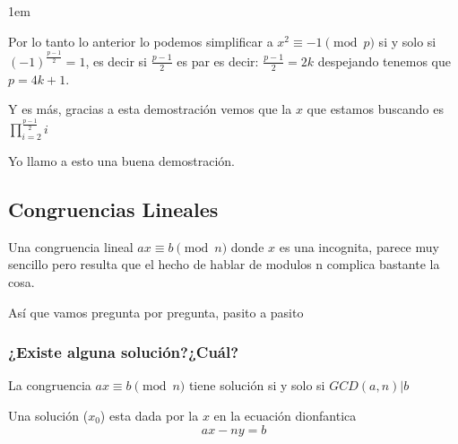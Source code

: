 \documentclass[12pt, fleqn]{report}                             %
\newenvironment{SmallIndentation}[1][0.75em]                    %
    {\begin{adjustwidth}{#1}{}\begin{footnotesize}}                 %
    {\end{footnotesize}\end{adjustwidth}}                           %
\begin{document}
\begin{itemize}
\begin{SmallIndentation}[1em]
                    Por lo tanto lo anterior lo podemos simplificar a 
                    $x^2 \equiv -1 \pmod{p}$ si y solo si 
                    $(-1)^{\frac{p-1}{2}} = 1$, es decir si $\frac{p-1}{2}$ es par
                    es decir: $\frac{p-1}{2} = 2k$ despejando tenemos que 
                    $p=4k+1$.


                    Y es más, gracias a esta demostración vemos que la $x$ que estamos
                    buscando es $\prod_{i=2}^{\frac{p-1}{2}} i$
                    
                    Yo llamo a esto una buena demostración.

                \end{SmallIndentation}
            \end{itemize}



        \subsection{Congruencias Lineales}


            Una congruencia lineal $ax \equiv b \pmod{n}$ donde $x$ es una incognita,
            parece muy sencillo pero resulta que el hecho de hablar de modulos n complica
            bastante la cosa.

            Así que vamos pregunta por pregunta, pasito a pasito

            \subsubsection{¿Existe alguna solución?¿Cuál?}
                La congruencia $ax \equiv b \pmod{n}$ tiene solución si y solo si 
                $GCD(a, n) | b$

                Una solución ($x_0$) esta dada por la $x$ en la ecuación 
                dionfantica
                \begin{equation*}
                    ax - ny = b
                \end{equation*}
\end{document}
